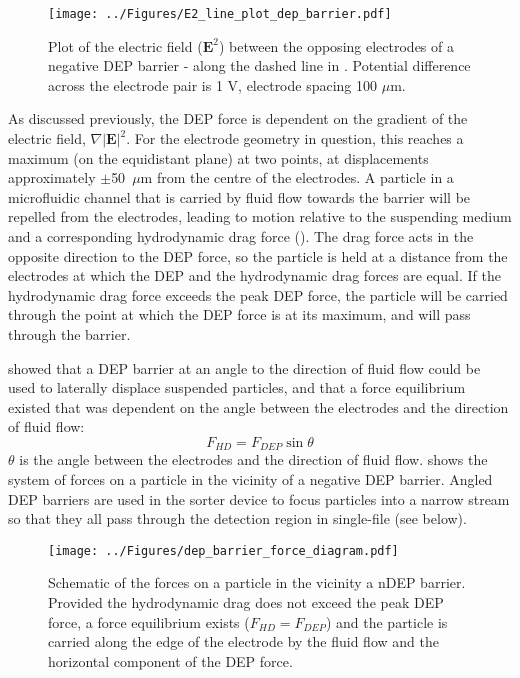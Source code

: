 \begin{figure}[p]
 \centering
 \texttt{[image: ../Figures/E2\_line\_plot\_dep\_barrier.pdf]}
 \caption[Plot of the electric field on a centre line through a negative DEP barrier.]{Plot of the electric field ($\textbf{E}^{2}$) between the opposing electrodes of a negative DEP barrier - along the dashed line in . Potential difference across the electrode pair is 1 V, electrode spacing 100 $\mu$m.}
 \label{fig:E2_line_plot_dep_barrier}
\end{figure}

As discussed previously, the DEP force is dependent on the gradient of the electric field, $\nabla \left | \textbf{E} \right | ^{2}$. For the electrode geometry in question, this reaches a maximum (on the equidistant plane) at two points, at displacements approximately $\pm$50~$\mu$m from the centre of the electrodes. A particle in a microfluidic channel that is carried by fluid flow towards the barrier will be repelled from the electrodes, leading to motion relative to the suspending medium and a corresponding hydrodynamic drag force (). The drag force acts in the opposite direction to the DEP force, so the particle is held at a distance from the electrodes at which the DEP and the hydrodynamic drag forces are equal. If the hydrodynamic drag force exceeds the peak DEP force, the particle will be carried through the point at which the DEP force is at its maximum, and will pass through the barrier.

\cite{Schnelle:1999} showed that a DEP barrier at an angle to the direction of fluid flow could be used to laterally displace suspended particles, and that a force equilibrium existed that was dependent on the angle between the electrodes and the direction of fluid flow:
\nopagebreak[3]
\begin{equation}
 F_{HD} = F_{DEP} \sin \theta
\label{eqn:stokes_force_against_DEP_barrier}
\end{equation}
\nopagebreak[3]
$\theta$ is the angle between the electrodes and the direction of fluid flow.  shows the system of forces on a particle in the vicinity of a negative DEP barrier. Angled DEP barriers are used in the sorter device to focus particles into a narrow stream so that they all pass through the detection region in single-file (see below).

\begin{figure}
 \centering
 \texttt{[image: ../Figures/dep\_barrier\_force\_diagram.pdf]}
 \caption[Schematic of the forces on a particle in the vicinity a nDEP barrier.]{Schematic of the forces on a particle in the vicinity a nDEP barrier. Provided the hydrodynamic drag does not exceed the peak DEP force, a force equilibrium exists ($F_{HD} = F_{DEP}$) and the particle is carried along the edge of the electrode by the fluid flow and the horizontal component of the DEP force.}
 \label{fig:dep_barrier_force_diagram}
\end{figure}


